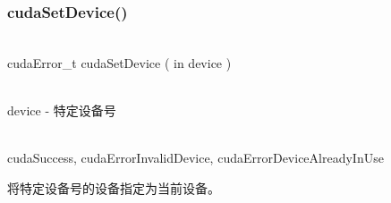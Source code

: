 \subsubsection{cudaSetDevice()}
\begin{cnfrmfunc}
\item{}\\
cudaError\_t cudaSetDevice ( in device ) 
\item{}\\
device - 特定设备号\\
\item{}\\
cudaSuccess, cudaErrorInvalidDevice, cudaErrorDeviceAlreadyInUse
\end{cnfrmfunc}
将特定设备号的设备指定为当前设备。

